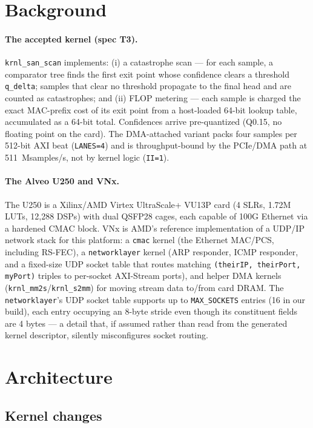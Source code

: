 \documentclass[11pt,a4paper]{article}
\newcommand{\code}[1]{\texttt{#1}}
\begin{document}
\section{Background}

\paragraph{The accepted kernel (spec T3).} \code{krnl\_san\_scan}
implements: (i) a catastrophe scan --- for each sample, a comparator
tree finds the first exit point whose confidence clears a threshold
\code{q\_delta}; samples that clear no threshold propagate to the final
head and are counted as catastrophes; and (ii) FLOP metering --- each
sample is charged the exact MAC-prefix cost of its exit point from a
host-loaded 64-bit lookup table, accumulated as a 64-bit total.
Confidences arrive pre-quantized (Q0.15, no floating point on the card).
The DMA-attached variant packs four samples per 512-bit AXI beat
(\code{LANES=4}) and is throughput-bound by the PCIe/DMA path at
511~Msamples/s, not by kernel logic (\code{II=1}).

\paragraph{The Alveo U250 and VNx.} The U250 is a Xilinx/AMD Virtex
UltraScale+ VU13P card (4 SLRs, 1.72M LUTs, 12{,}288 DSPs) with dual
QSFP28 cages, each capable of 100G Ethernet via a hardened CMAC block.
VNx is AMD's reference implementation of a UDP/IP network stack for
this platform: a \code{cmac} kernel (the Ethernet MAC/PCS, including
RS-FEC), a \code{networklayer} kernel (ARP responder, ICMP responder,
and a fixed-size UDP socket table that routes matching
\code{(theirIP, theirPort, myPort)} triples to per-socket AXI-Stream
ports), and helper DMA kernels (\code{krnl\_mm2s}/\code{krnl\_s2mm}) for
moving stream data to/from card DRAM. The \code{networklayer}'s UDP
socket table supports up to \code{MAX\_SOCKETS} entries (16 in our
build), each entry occupying an 8-byte stride even though its
constituent fields are 4 bytes --- a detail that, if assumed rather than
read from the generated kernel descriptor, silently misconfigures socket
routing.

\section{Architecture}

\subsection{Kernel changes}
\end{document}
